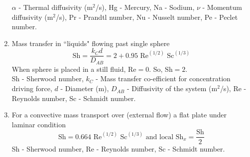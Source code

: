 \documentclass[a4paper, 12 pt]{article}
\begin{document}
\begin{enumerate}
        $\alpha$ - Thermal diffusivity (m$^2$/s),
        Hg - Mercury,
        Na - Sodium,
        $\nu$ - Momentum diffusivity (m$^2$/s),
        Pr -  Prandtl  number,
        Nu - Nusselt  number,
        Pe - Peclet number.
        
        
        \item Mass transfer in ``liquids" flowing past single sphere\\$$\text{Sh}=\frac{k_Cd}{D_{AB}}=2+0.95\text{ Re}^{(1/2)}\text{ Sc}^{(1/3)}$$ When sphere is placed in a still fluid, Re$=0$. So, $\boxed{\text{Sh}=2}$.\\[3 mm]
        Sh - Sherwood  number,
        $k_C$ - Mass transfer co-efficient for concentration driving force,
        $d$ - Diameter (m),
        $D_{AB}$ - Diffusivity of the system (m$^2$/s),
        Re - Reynolds  number,
        Sc - Schmidt number.
        
        \item For a convective mass transport over (external flow) a flat plate under laminar condition $$\text{Sh}=0.664\text{ Re}^{(1/2)}\text{ Sc}^{(1/3)} \text{ and local Sh}_x =\frac{\text{Sh}}{2}$$
        Sh - Sherwood  number, Re - Reynolds  number, Sc - Schmidt number.
\end{enumerate}
\end{document}
